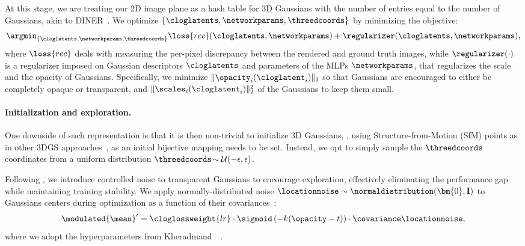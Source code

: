     At this stage, we are treating our 2D image plane as a hash table for 3D
    Gaussians with the number of entries equal to the number of Gaussians,
    akin to DINER~\cite{xie2023diner}.
    We optimize $\{\cloglatents,\networkparams,\threedcoords\}$ by minimizing the objective:
    \begin{equation}
      \label{eq:clog-first-stage-objective}
      \argmin_{\{\cloglatents,\networkparams,\threedcoords\}} \loss{rec}(\cloglatents, \networkparams) + \regularizer(\cloglatents, \networkparams),
    \end{equation}
    where $\loss{rec}$ deals with measuring the per-pixel discrepancy between the rendered and ground truth images, while $\regularizer(\cdot)$ is a regularizer imposed on Gaussian descriptors $\cloglatents$ and parameters of the MLPs $\networkparams$,
    that regularizes the scale and the opacity of Gaussians.
    Specifically, we minimize $\|\opacity_i(\cloglatent_i)\|_1$ so that
    Gaussians are encouraged to either be completely opaque or transparent,
    and $\|\scales_i(\cloglatent_i)\|_2^2$ of the Gaussians to keep them
    small.

    \paragraph{Initialization and exploration.}
      One downside of such representation is that it is then non-trivial to
      initialize 3D Gaussians, \eg, using Structure-from-Motion (SfM) points
      as in other 3DGS
      approaches~\cite{lu2024scaffold,ren2024octree,seo2024flod,taming3dgs2024mallick,kerbl20233d},
      as an initial bijective mapping needs to be set.
      Instead, we opt to simply sample the $\threedcoords$ coordinates from a
      uniform distribution \mbox{$\threedcoords\!
          \sim\mathcal{U}(-\epsilon,\epsilon)$}.

      Following \citet{kheradmand20243d}, we introduce controlled noise to
      transparent Gaussians to encourage exploration, effectively eliminating
      the performance gap while maintaining training stability.
      We apply normally-distributed noise $\locationnoise\sim\normaldistribution(\bm{0}, \textbf{I})$ to Gaussians centers during optimization as a function of their covariances~\cite{kheradmand20243d}:
      \begin{equation}
        \label{eq:clog-noise-loc}
        \modulated{\mean}' = \cloglossweight{lr} \cdot \sigmoid\left(-k(\opacity - t)\right)\cdot \covariance \locationnoise,
      \end{equation}
      where we adopt the hyperparameters from Kheradmand~\etal~\cite{kheradmand20243d}.

